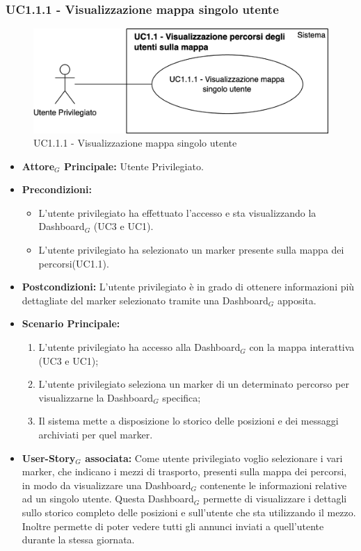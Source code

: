 \documentclass[11pt]{article}
\begin{document}
\begin{justify}
\subsubsection{\textbf{UC1.1.1 - Visualizzazione mappa singolo utente}}
\begin{figure}[H]
    \centering
    \includegraphics[width=0.7\linewidth]{UC1.1.1imagee.png}
    \caption{UC1.1.1 - Visualizzazione mappa singolo utente}
    \label{fig:UC1.1.1}
\end{figure}
\label{UC1.1.1}
\begin{itemize}
     \item \textbf{Attore$_G$ Principale:} Utente Privilegiato.
     \item \textbf{Precondizioni:}
        \begin{itemize}
    		\item L'utente privilegiato ha effettuato l'accesso e sta      visualizzando la Dashboard$_G$ (UC3 e UC1).
    	        \item L'utente privilegiato ha selezionato un marker presente sulla mappa dei percorsi(UC1.1).
        \end{itemize}
     \item \textbf{Postcondizioni:} L'utente privilegiato è in grado di ottenere informazioni più dettagliate del marker selezionato tramite una Dashboard$_G$ apposita.
     \item \textbf{Scenario Principale:}
        \begin{enumerate}
            \item L'utente privilegiato ha accesso alla Dashboard$_G$ con la mappa interattiva (UC3 e UC1);
            \item L'utente privilegiato seleziona un marker di un determinato percorso per visualizzarne la Dashboard$_G$ specifica;
            \item Il sistema mette a disposizione lo storico delle posizioni e dei messaggi archiviati per quel marker.
        \end{enumerate}
     \item \textbf{User-Story$_G$ associata:}
     Come utente privilegiato voglio selezionare i vari marker, che indicano i mezzi di trasporto, presenti sulla mappa dei percorsi, in modo da visualizzare una Dashboard$_G$ contenente le informazioni relative ad un singolo utente. Questa Dashboard$_G$ permette di visualizzare i dettagli sullo storico completo delle posizioni e sull'utente che sta utilizzando il mezzo. Inoltre permette di poter vedere tutti gli annunci inviati a quell'utente durante la stessa giornata.
\end{itemize}


\end{justify}
\end{document}
